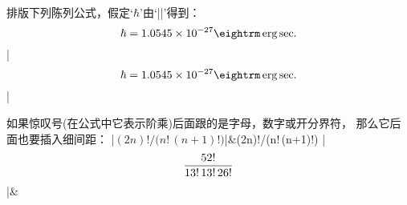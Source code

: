 \dangerexercise 排版下列陈列公式，假定`$\hbar$'由`|\hbar|'得到：
$$\hbar=1.0545\times10^{-27}\rm\,erg\,sec.$$
\answer |$$\hbar=1.0545\times10^{-27}\rm\,erg\,sec.$$|

\danger 如果惊叹号(在公式中它表示阶乘)后面跟的是字母，数字或开分界符，
那么它后面也要插入细间距：
\beginmathdemo
|$(2n)!/\bigl(n!\,(n+1)!\bigr)$|&(2n)!/\bigl(n!\,(n+1)!\bigr)\cr
\noalign{\vskip6pt}
|$${52!\over13!\,13!\,26!}$$|&\cr
\endmathdemo

